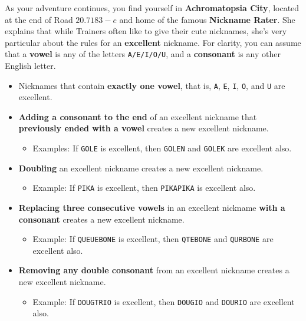 

As your adventure continues, you find yourself in
\textbf{Achromatopsia City}, located at the end of Road \(20.7183-e\)
and home of the famous \textbf{Nickname Rater}.
She explains that while Trainers often like to give their
\mappMobimon{} cute nicknames, she's very particular about the rules
for an \textbf{excellent} nickname. For clarity, you can assume
that a \textbf{vowel} is any of the letters \texttt{A/E/I/O/U}, and a
\textbf{consonant} is any other English letter.

\begin{itemize}
  \item Nicknames that contain \textbf{exactly one vowel}, that is,
        \texttt{A}, \texttt{E}, \texttt{I}, \texttt{O}, and
        \texttt{U} are excellent.
  \item \textbf{Adding a consonant to the end} of an excellent nickname
        that \textbf{previously ended with a vowel}
        creates a new excellent nickname.
    \begin{itemize}
      \item Examples: If \texttt{GOLE} is excellent, then
            \texttt{GOLEN} and \texttt{GOLEK} are excellent also.
    \end{itemize}
  \item \textbf{Doubling} an excellent nickname creates a new excellent
        nickname.
    \begin{itemize}
      \item Example: If \texttt{PIKA} is excellent, then
            \texttt{PIKAPIKA} is excellent also.
    \end{itemize}
  \item \textbf{Replacing three consecutive vowels} in
        an excellent nickname \textbf{with a consonant}
        creates a new excellent nickname.
    \begin{itemize}
      \item Example: If \texttt{QUEUEBONE} is excellent, then
        \texttt{QTEBONE} and \texttt{QURBONE} are excellent also.
    \end{itemize}
  \item \textbf{Removing any double consonant} from an excellent nickname
        creates a new excellent nickname.
    \begin{itemize}
      \item Example: If \texttt{DOUGTRIO} is excellent, then
        \texttt{DOUGIO} and \texttt{DOURIO} are excellent also.
    \end{itemize}
\end{itemize}

